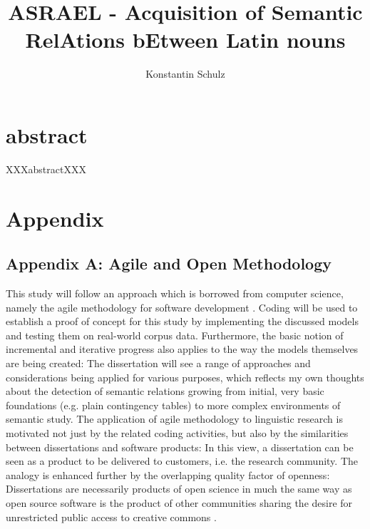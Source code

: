 \documentclass[oneside]{book}
\begin{document}
\frontmatter
\title{ASRAEL - Acquisition of Semantic RelAtions bEtween Latin nouns}
\author{Konstantin Schulz}
\maketitle
\tableofcontents
\listoffigures
\listoftables
\printglossaries

\chapter*{abstract}
XXXabstractXXX
\mainmatter







\chapter{Appendix}
\section{Appendix A: Agile and Open Methodology}
\label{sec:appendixA}
This study will follow an approach which is borrowed from computer science, namely the agile methodology for software development \parencite[32]{fowlerAgileManifesto2001}. Coding will be used to establish a proof of concept for this study by implementing the discussed models and testing them on real-world corpus data. Furthermore, the basic notion of incremental and iterative progress also applies to the way the models themselves are being created: The dissertation will see a range of approaches and considerations being applied for various purposes, which reflects my own thoughts about the detection of semantic relations growing from initial, very basic foundations (e.g. plain contingency tables) to more complex environments of semantic study. The application of agile methodology to linguistic research is motivated not just by the related coding activities, but also by the similarities between dissertations and software products: In this view, a dissertation can be seen as a product to be delivered to customers, i.e. the research community. The analogy is enhanced further by the overlapping quality factor of openness: Dissertations are necessarily products of open science in much the same way as open source software is the product of other communities sharing the desire for unrestricted public access to creative commons \parencite[518]{garcia-penalvoOpenKnowledgeManagement2010}. 
\end{document}
